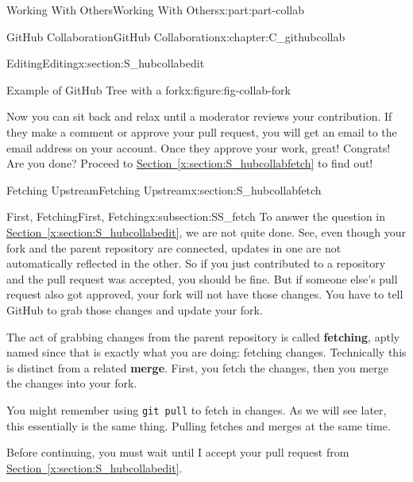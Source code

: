 \documentclass[oneside,10pt,]{book}
\newcommand{\xreffont}{\relax}
\newcommand{\mono}[1]{\texttt{#1}}
\newcommand{\terminology}[1]{\textbf{#1}}
\begin{document}
\begin{partptx}{Working With Others}{}{Working With Others}{}{}{x:part:part-collab}
\begin{chapterptx}{GitHub Collaboration}{}{GitHub Collaboration}{}{}{x:chapter:C_githubcollab}
\begin{sectionptx}{Editing}{}{Editing}{}{}{x:section:S_hubcollabedit}
\begin{figureptx}{Example of GitHub Tree with a fork}{x:figure:fig-collab-fork}{}
\begin{image}{0.025}{0.95}{0.025}
\end{image}%
\tcblower
\end{figureptx}%
Now you can sit back and relax until a moderator reviews your contribution. If they make a comment or approve your pull request, you will get an email to the email address on your account. Once they approve your work, great! Congrats! Are you done? Proceed to \hyperref[x:section:S_hubcollabfetch]{Section~{\xreffont\ref{x:section:S_hubcollabfetch}}} to find out!%
\end{sectionptx}
%
%
\typeout{************************************************}
\typeout{************************************************}
%
\begin{sectionptx}{Fetching Upstream}{}{Fetching Upstream}{}{}{x:section:S_hubcollabfetch}
%
%
\typeout{************************************************}
\typeout{************************************************}
%
\begin{subsectionptx}{First, Fetching}{}{First, Fetching}{}{}{x:subsection:SS_fetch}
%
%
To answer the question in \hyperref[x:section:S_hubcollabedit]{Section~{\xreffont\ref{x:section:S_hubcollabedit}}}, we are not quite done. See, even though your fork and the parent repository are connected, updates in one are not automatically reflected in the other. So if you just contributed to a repository and the pull request was accepted, you should be fine. But if someone else's pull request also got approved, your fork will not have those changes. You have to tell GitHub to grab those changes and update your fork.%
\par
The act of grabbing changes from the parent repository is called \terminology{fetching}, aptly named since that is exactly what you are doing: fetching changes. Technically this is distinct from a related \terminology{merge}. First, you fetch the changes, then you merge the changes into your fork.%
\par
You might remember using \mono{git pull} to fetch in changes. As we will see later, this essentially is the same thing. Pulling fetches and merges at the same time.%
\par
Before continuing, you must wait until I accept your pull request from \hyperref[x:section:S_hubcollabedit]{Section~{\xreffont\ref{x:section:S_hubcollabedit}}}.%
\end{subsectionptx}
%
%
\typeout{************************************************}

\end{sectionptx}
\end{chapterptx}
\end{partptx}
\end{document}

